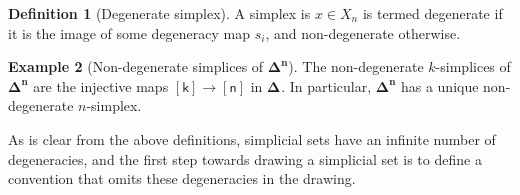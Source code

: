\documentclass[10pt]{amsart}
\newcommand{\Simplex}[1]{\ensuremath{\boldsymbol{\Delta^{#1}}}}
\newcommand{\sq}[1]{\ensuremath{\mathsf{[#1]}}}
\theoremstyle{definition}
\newtheorem{definition}{Definition}[section]
\newtheorem{example}[definition]{Example}
\numberwithin{definition}{subsection}
\numberwithin{definition}{section}
\begin{document}
\begin{definition}[Degenerate simplex]
  A simplex is $x \in X_n$ is termed degenerate if it is the image of some degeneracy map $s_i$, and non-degenerate otherwise.
\end{definition}

\begin{example}[Non-degenerate simplices of \Simplex{n}]
  The non-degenerate $k$-simplices of $\Simplex{n}$ are the injective maps $\sq{k} \rightarrow \sq{n}$ in $\Simplex{}$. In particular, $\Simplex{n}$ has a unique non-degenerate $n$-simplex.
\end{example}

As is clear from the above definitions, simplicial sets have an infinite number of degeneracies, and the first step towards drawing a simplicial set is to define a convention that omits these degeneracies in the drawing.
\end{document}
